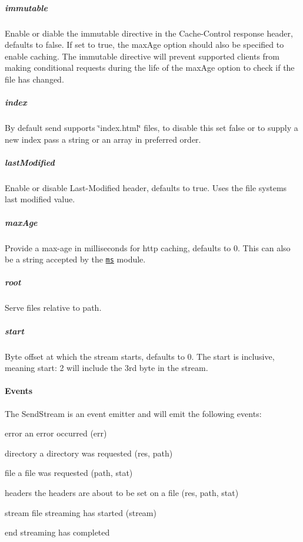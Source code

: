 \subparagraph*{immutable}

Enable or diable the {\ttfamily immutable} directive in the {\ttfamily Cache-\/\+Control} response header, defaults to {\ttfamily false}. If set to {\ttfamily true}, the {\ttfamily max\+Age} option should also be specified to enable caching. The {\ttfamily immutable} directive will prevent supported clients from making conditional requests during the life of the {\ttfamily max\+Age} option to check if the file has changed.

\subparagraph*{index}

By default send supports \char`\"{}index.\+html\char`\"{} files, to disable this set {\ttfamily false} or to supply a new index pass a string or an array in preferred order.

\subparagraph*{last\+Modified}

Enable or disable {\ttfamily Last-\/\+Modified} header, defaults to true. Uses the file system\textquotesingle{}s last modified value.

\subparagraph*{max\+Age}

Provide a max-\/age in milliseconds for http caching, defaults to 0. This can also be a string accepted by the \href{https://www.npmjs.org/package/ms#readme}{\tt ms} module.

\subparagraph*{root}

Serve files relative to {\ttfamily path}.

\subparagraph*{start}

Byte offset at which the stream starts, defaults to 0. The start is inclusive, meaning {\ttfamily start\+: 2} will include the 3rd byte in the stream.

\paragraph*{Events}

The {\ttfamily Send\+Stream} is an event emitter and will emit the following events\+:


\begin{DoxyItemize}
\item {\ttfamily error} an error occurred {\ttfamily (err)}
\item {\ttfamily directory} a directory was requested {\ttfamily (res, path)}
\item {\ttfamily file} a file was requested {\ttfamily (path, stat)}
\item {\ttfamily headers} the headers are about to be set on a file {\ttfamily (res, path, stat)}
\item {\ttfamily stream} file streaming has started {\ttfamily (stream)}
\item {\ttfamily end} streaming has completed
\end{DoxyItemize}


